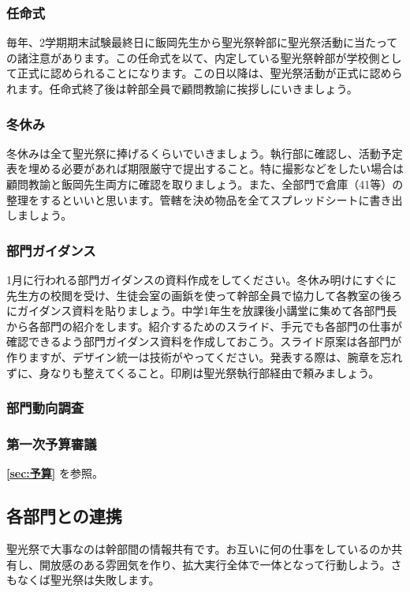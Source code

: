 \documentclass[dvipdfmx,jb5]{jarticle}
\begin{document}
\subsubsection{任命式}
毎年、2学期期末試験最終日に飯岡先生から聖光祭幹部に聖光祭活動に当たっての諸注意があります。この任命式を以て、内定している聖光祭幹部が学校側として正式に認められることになります。この日以降は、聖光祭活動が正式に認められます。任命式終了後は幹部全員で顧問教諭に挨拶しにいきましょう。

\subsubsection{冬休み}
冬休みは全て聖光祭に捧げるくらいでいきましょう。執行部に確認し、活動予定表を埋める必要があれば期限厳守で提出すること。特に撮影などをしたい場合は顧問教諭と飯岡先生両方に確認を取りましょう。また、全部門で倉庫（41等）の整理をするといいと思います。管轄を決め物品を全てスプレッドシートに書き出しましょう。

\subsubsection{部門ガイダンス}
1月に行われる部門ガイダンスの資料作成をしてください。冬休み明けにすぐに先生方の校閲を受け、生徒会室の画鋲を使って幹部全員で協力して各教室の後ろにガイダンス資料を貼りましょう。中学1年生を放課後小講堂に集めて各部門長から各部門の紹介をします。紹介するためのスライド、手元でも各部門の仕事が確認できるよう部門ガイダンス資料を作成しておこう。スライド原案は各部門が作りますが、デザイン統一は技術がやってください。発表する際は、腕章を忘れずに、身なりも整えてくること。印刷は聖光祭執行部経由で頼みましょう。

\subsubsection{部門動向調査}


\subsubsection{第一次予算審議}
{\bf \ref{sec:予算}} を参照。



\subsection{各部門との連携}
聖光祭で大事なのは幹部間の情報共有です。お互いに何の仕事をしているのか共有し、開放感のある雰囲気を作り、拡大実行全体で一体となって行動しよう。さもなくば聖光祭は失敗します。
\end{document}
